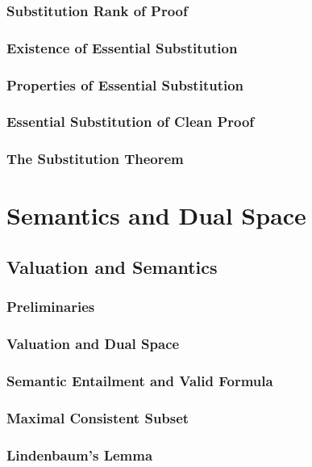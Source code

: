 \documentclass{report}
\begin{document}
    \subsection{Substitution Rank of Proof}
      
    \subsection{Existence of Essential Substitution}
      
    \subsection{Properties of Essential Substitution}
      
    \subsection{Essential Substitution of Clean Proof}
      
    \subsection{The Substitution Theorem}
      
\chapter{Semantics and Dual Space}
\section{Valuation and Semantics}
    \subsection{Preliminaries}
      
    \subsection{Valuation and Dual Space}
      
    \subsection{Semantic Entailment and Valid Formula}
      
    \subsection{Maximal Consistent Subset}
      
    \subsection{Lindenbaum's Lemma}
      
\end{document}
